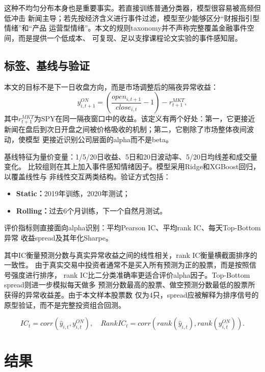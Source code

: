 \documentclass[UTF8,a4paper,10pt,twocolumn,fontset=none]{ctexart}
\begin{document}
这种不均匀分布本身也是重要事实。若直接训练普通分类器，模型很容易被高频但低冲击
新闻主导；若先按经济含义进行事件过滤，模型至少能够区分“财报指引型情绪”和“产品
运营型情绪”。本文的规则taxonomy并不声称完整覆盖金融事件空间，而是提供一个低成本、
可复现、足以支撑课程论文实验的事件感知层。

\subsection{标签、基线与验证}

本文的目标不是下一日收盘方向，而是市场调整后的隔夜异常收益：
\begin{equation}
y^{ON}_{i,t+1} = \left(\frac{open_{i,t+1}}{close_{i,t}} - 1\right) - r^{MKT}_{t+1},
\end{equation}
其中$r^{MKT}_{t+1}$为SPY在同一隔夜窗口中的收益。该定义有两个好处：第一，它更接近
新闻在盘后到次日开盘之间被价格吸收的机制；第二，它剔除了市场整体夜间波动，使模型
更接近识别公司层面的alpha而不是beta。

基线特征为量价变量：1/5/20日收益、5日和20日波动率、5/20日均线差和成交量变化。
比较组则在其上加入事件感知情绪因子。模型采用Ridge和XGBoost回归，以覆盖线性与
非线性交互两类结构。验证方式包括：
\begin{itemize}[leftmargin=1.4em]
  \item \textbf{Static：}2019年训练，2020年测试；
  \item \textbf{Rolling：}过去6个月训练，下一个自然月测试。
\end{itemize}
评价指标则直接面向alpha识别：平均Pearson IC、平均rank IC、每天Top-Bottom异常
收益spread及其年化Sharpe。

其中IC衡量预测分数与真实异常收益之间的线性相关，rank IC衡量横截面排序的一致性。
由于真实交易中投资者通常不是买入所有预测为正的股票，而是按照信号强度进行排序，
rank IC比二分类准确率更适合评价alpha因子。Top-Bottom spread则进一步模拟每天做多
预测分数最高的股票、做空预测分数最低的股票所获得的异常收益差。由于本文样本股票数
仅为4只，spread应被解释为排序信号的原型验证，而不是完整投资组合回测。

\begin{equation}
IC_t = corr(\hat{y}_{i,t}, y^{ON}_{i,t}), \quad
RankIC_t = corr(rank(\hat{y}_{i,t}), rank(y^{ON}_{i,t})).
\end{equation}

\section{结果}
\end{document}
